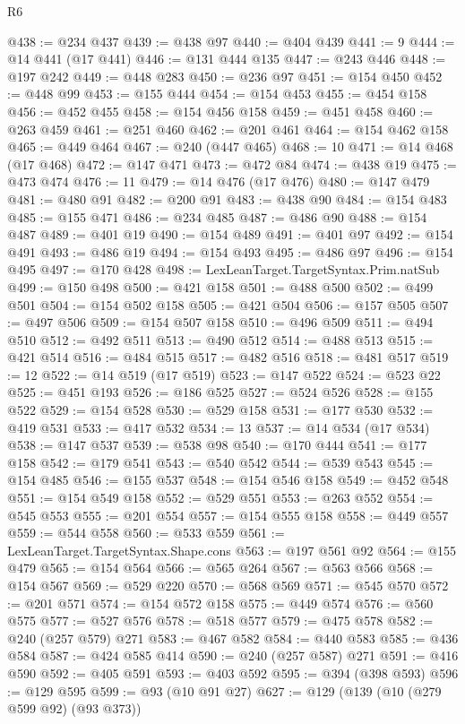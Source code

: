 \begin{lexlean}{R6}
\begin{coremodule}
{{{{{{{{{{{{{{{{{{{{{{{{{{{{{{{{{{{{{{{{{{{{{{{{{{{{{{{{{{{{{{{{{{{{{{{{@438 := @234 @437
@439 := @438 @97
@440 := @404 @439
@441 := 9
@444 := @14 @441 (@17 @441)
@446 := @131 @444 @135
@447 := @243 @446
@448 := @197 @242
@449 := @448 @283
@450 := @236 @97
@451 := @154 @450
@452 := @448 @99
@453 := @155 @444
@454 := @154 @453
@455 := @454 @158
@456 := @452 @455
@458 := @154 @456 @158
@459 := @451 @458
@460 := @263 @459
@461 := @251 @460
@462 := @201 @461
@464 := @154 @462 @158
@465 := @449 @464
@467 := @240 (@447 @465)
@468 := 10
@471 := @14 @468 (@17 @468)
@472 := @147 @471
@473 := @472 @84
@474 := @438 @19
@475 := @473 @474
@476 := 11
@479 := @14 @476 (@17 @476)
@480 := @147 @479
@481 := @480 @91
@482 := @200 @91
@483 := @438 @90
@484 := @154 @483
@485 := @155 @471
@486 := @234 @485
@487 := @486 @90
@488 := @154 @487
@489 := @401 @19
@490 := @154 @489
@491 := @401 @97
@492 := @154 @491
@493 := @486 @19
@494 := @154 @493
@495 := @486 @97
@496 := @154 @495
@497 := @170 @428
@498 := LexLeanTarget.TargetSyntax.Prim.natSub
@499 := @150 @498
@500 := @421 @158
@501 := @488 @500
@502 := @499 @501
@504 := @154 @502 @158
@505 := @421 @504
@506 := @157 @505
@507 := @497 @506
@509 := @154 @507 @158
@510 := @496 @509
@511 := @494 @510
@512 := @492 @511
@513 := @490 @512
@514 := @488 @513
@515 := @421 @514
@516 := @484 @515
@517 := @482 @516
@518 := @481 @517
@519 := 12
@522 := @14 @519 (@17 @519)
@523 := @147 @522
@524 := @523 @22
@525 := @451 @193
@526 := @186 @525
@527 := @524 @526
@528 := @155 @522
@529 := @154 @528
@530 := @529 @158
@531 := @177 @530
@532 := @419 @531
@533 := @417 @532
@534 := 13
@537 := @14 @534 (@17 @534)
@538 := @147 @537
@539 := @538 @98
@540 := @170 @444
@541 := @177 @158
@542 := @179 @541
@543 := @540 @542
@544 := @539 @543
@545 := @154 @485
@546 := @155 @537
@548 := @154 @546 @158
@549 := @452 @548
@551 := @154 @549 @158
@552 := @529 @551
@553 := @263 @552
@554 := @545 @553
@555 := @201 @554
@557 := @154 @555 @158
@558 := @449 @557
@559 := @544 @558
@560 := @533 @559
@561 := LexLeanTarget.TargetSyntax.Shape.cons
@563 := @197 @561 @92
@564 := @155 @479
@565 := @154 @564
@566 := @565 @264
@567 := @563 @566
@568 := @154 @567
@569 := @529 @220
@570 := @568 @569
@571 := @545 @570
@572 := @201 @571
@574 := @154 @572 @158
@575 := @449 @574
@576 := @560 @575
@577 := @527 @576
@578 := @518 @577
@579 := @475 @578
@582 := @240 (@257 @579) @271
@583 := @467 @582
@584 := @440 @583
@585 := @436 @584
@587 := @424 @585 @414
@590 := @240 (@257 @587) @271
@591 := @416 @590
@592 := @405 @591
@593 := @403 @592
@595 := @394 (@398 @593)
@596 := @129 @595
@599 := @93 (@10 @91 @27)
@627 := @129
    (@139
      (@10 (@279 @599 @92) (@93 @373))
}}}}}}}}}}}}}}}}}}}}}}}}}}}}}}}}}}}}}}}}}}}}}}}}}}}}}}}}}}}}}}}}}}}}}}}}
\end{coremodule}
\end{lexlean}
